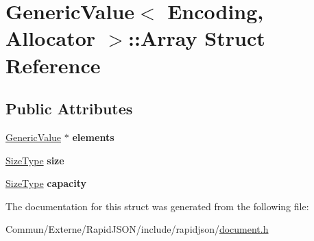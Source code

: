 \hypertarget{struct_generic_value_1_1_array}{}\section{Generic\+Value$<$ Encoding, Allocator $>$\+:\+:Array Struct Reference}
\label{struct_generic_value_1_1_array}
\subsection*{Public Attributes}
\begin{DoxyCompactItemize}
\item 
\hyperlink{class_generic_value}{Generic\+Value} $\ast$ {\bfseries elements}\hypertarget{struct_generic_value_1_1_array_a0af8e50f37486f042ab19fd871d11d4f}{}\label{struct_generic_value_1_1_array_a0af8e50f37486f042ab19fd871d11d4f}

\item 
\hyperlink{rapidjson_8h_a5ed6e6e67250fadbd041127e6386dcb5}{Size\+Type} {\bfseries size}\hypertarget{struct_generic_value_1_1_array_a60f69b3b57b86c20c123c1b080e34bcc}{}\label{struct_generic_value_1_1_array_a60f69b3b57b86c20c123c1b080e34bcc}

\item 
\hyperlink{rapidjson_8h_a5ed6e6e67250fadbd041127e6386dcb5}{Size\+Type} {\bfseries capacity}\hypertarget{struct_generic_value_1_1_array_a2f5dfb089ee750e9405d5adeda4df894}{}\label{struct_generic_value_1_1_array_a2f5dfb089ee750e9405d5adeda4df894}

\end{DoxyCompactItemize}


The documentation for this struct was generated from the following file\+:\begin{DoxyCompactItemize}
\item 
Commun/\+Externe/\+Rapid\+J\+S\+O\+N/include/rapidjson/\hyperlink{document_8h}{document.\+h}\end{DoxyCompactItemize}
